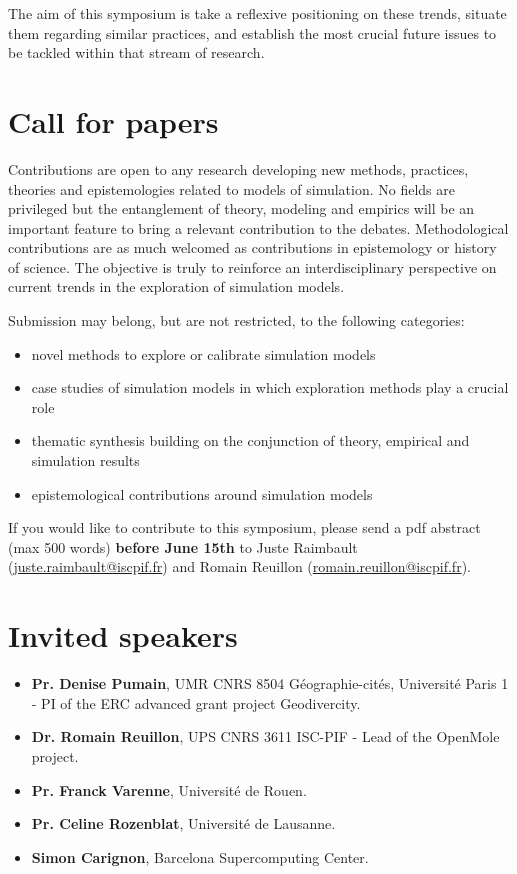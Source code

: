 \documentclass[11pt]{article}
\begin{document}
\medskip

The aim of this symposium is take a reflexive positioning on these trends, situate them regarding similar practices, and establish the most crucial future issues to be tackled within that stream of research.

\section*{Call for papers}

Contributions are open to any research developing new methods, practices, theories and epistemologies related to models of simulation. No fields are privileged but the entanglement of theory, modeling and empirics will be an important feature to bring a relevant contribution to the debates. Methodological contributions are as much welcomed as contributions in epistemology or history of science. The objective is truly to reinforce an interdisciplinary perspective on current trends in the exploration of simulation models.

\medskip

Submission may belong, but are not restricted, to the following categories:
\begin{itemize}
	\item novel methods to explore or calibrate simulation models
	\item case studies of simulation models in which exploration methods play a crucial role
	\item thematic synthesis building on the conjunction of theory, empirical and simulation results
	\item epistemological contributions around simulation models
\end{itemize}

\medskip
    
    
If you would like to contribute to this symposium, please send a pdf abstract (max 500 words) \textbf{before June 15th} to Juste Raimbault (\href{mailto:juste.raimbault@iscpif.fr}{juste.raimbault@iscpif.fr}) and Romain Reuillon (\href{mailto:romain.reuillon@iscpif.fr}{romain.reuillon@iscpif.fr}). 
    


\section*{Invited speakers}

\begin{itemize}
    \item \textbf{Pr. Denise Pumain}, UMR CNRS 8504 Géographie-cités, Université Paris 1 - PI of the ERC advanced grant project Geodivercity.
    \item \textbf{Dr. Romain Reuillon}, UPS CNRS 3611 ISC-PIF - Lead of the OpenMole project.
    \item \textbf{Pr. Franck Varenne}, Université de Rouen.
    \item \textbf{Pr. Celine Rozenblat}, Université de Lausanne.
    \item \textbf{Simon Carignon}, Barcelona Supercomputing Center.
\end{itemize}
\end{document}
